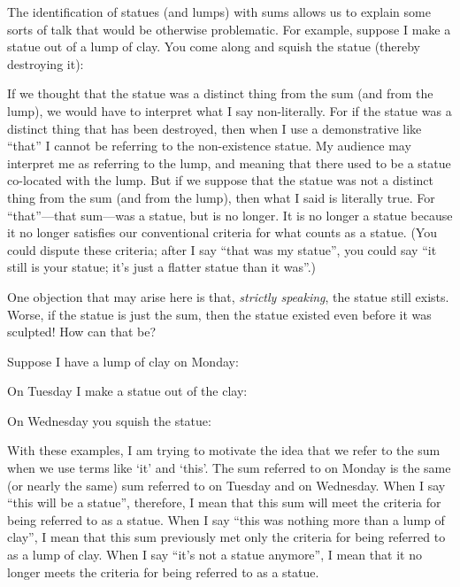 \documentclass[11pt]{article}
\begin{document}
\begin{spacing}{1.5}
The identification of statues (and lumps) with sums allows us to
explain some sorts of talk that would be otherwise problematic.  For
example, suppose I make a statue out of a lump of clay.  You come
along and squish the statue (thereby destroying it):


If we thought that the statue was a distinct thing from the sum (and
from the lump), we would have to interpret what I say non-literally.
For if the statue was a distinct thing that has been destroyed, then
when I use a demonstrative like ``that'' I cannot be referring to the
non-existence statue.  My audience may interpret me as referring to
the lump, and meaning that there used to be a statue co-located with
the lump.  But if we suppose that the statue was not a distinct thing
from the sum (and from the lump), then what I said is literally true.
For ``that''---that sum---was a statue, but is no longer.  It is no
longer a statue because it no longer satisfies our conventional
criteria for what counts as a statue.  (You could dispute these
criteria; after I say ``that was my statue'', you could say ``it still
is your statue; it's just a flatter statue than it was''.)

One objection that may arise here is that, {\em strictly speaking},
the statue still exists.  Worse, if the statue is just the sum, then
the statue existed even before it was sculpted!  How can that be?

Suppose I have a lump of clay on Monday:


On Tuesday I make a statue out of the clay:


On Wednesday you squish the statue:


With these examples, I am trying to motivate the idea that we refer to
the sum when we use terms like `it' and `this'.  The sum referred to
on Monday is the same (or nearly the same) sum referred to on Tuesday
and on Wednesday.  When I say ``this will be a statue'', therefore, I
mean that this sum will meet the criteria for being referred to as a
statue.  When I say ``this was nothing more than a lump of clay'', I
mean that this sum previously met only the criteria for being referred
to as a lump of clay.  When I say ``it's not a statue anymore'', I
mean that it no longer meets the criteria for being referred to as a
statue.


\end{spacing}
\end{document}

